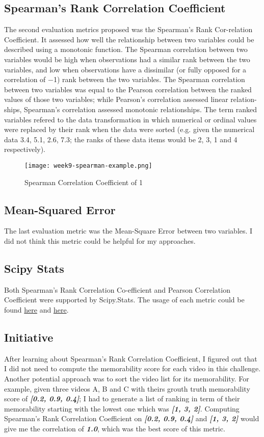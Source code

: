 \subsection{Spearman's Rank Correlation Coefficient}
The second evaluation metrics proposed was the Spearman's Rank Cor-relation Coefficient. It assessed how well the relationship between two variables could be described using a monotonic function. The Spearman correlation between two variables would be high when observations had a similar rank between the two variables, and low when observations have a dissimilar (or fully opposed for a correlation of −1) rank between the two variables. The Spearman correlation between two variables was equal to the Pearson correlation between the ranked values of those two variables; while Pearson's correlation assessed linear relation-ships, Spearman's correlation assessed monotonic relationships. The term ranked variables refered to the data transformation in which numerical or ordinal values were replaced by their rank when the data were sorted (e.g. given the numerical data 3.4, 5.1, 2.6, 7.3; the ranks of these data items would be 2, 3, 1 and 4 respectively).

\begin{figure}[!ht]
\centering
\texttt{[image: week9-spearman-example.png]}
\caption{Spearman Correlation Coefficient of 1}
\end{figure}

\subsection{Mean-Squared Error}
The last evaluation metric was the Mean-Square Error between two variables. I did not think this metric could be helpful for my approaches.

\subsection{Scipy Stats}
Both Spearman's Rank Correlation Co-efficient and Pearson Correlation Coefficient were supported by Scipy.Stats. The usage of each metric could be found \href{https://docs.scipy.org/doc/scipy/reference/generated/scipy.stats.spearmanr.html}{here} and \href{https://docs.scipy.org/doc/scipy-0.14.0/reference/generated/scipy.stats.pearsonr.html}{here}.

\subsection{Initiative}
After learning about Spearman's Rank Correlation Coefficient, I figured out that I did not need to compute the memorability score for each video in this challenge. Another potential approach was to sort the video list for its memorability. For example, given three videos A, B and C with theirs grouth truth memorability score of \textbf{\emph{[0.2, 0.9, 0.4]}}; I had to generate a list of ranking in term of their memorability starting with the lowest one which was \textbf{\emph{[1, 3, 2]}}. Computing Spearman's Rank Correlation Coefficient on \textbf{\emph{[0.2, 0.9, 0.4]}} and \textbf{\emph{[1, 3, 2]}} would give me the correlation of \textbf{\emph{1.0}}, which was the best score of this metric.

